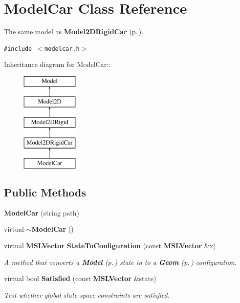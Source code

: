 \section{Model\-Car  Class Reference}
\label{classModelCar}
The same model as {\bf Model2DRigid\-Car} {\rm (p.\,\pageref{classModel2DRigidCar})}. 


{\tt \#include $<$modelcar.h$>$}

Inheritance diagram for Model\-Car::\begin{figure}[H]
\begin{center}
\leavevmode
\includegraphics[height=5cm]{classModelCar}
\end{center}
\end{figure}
\subsection*{Public Methods}
\begin{CompactItemize}
\item 
{\bf Model\-Car} (string path)
\item 
virtual {\bf $\sim$Model\-Car} ()
\item 
virtual {\bf MSLVector} {\bf State\-To\-Configuration} (const {\bf MSLVector} \&x)
\begin{CompactList}\small\item\em A method that converts a {\bf Model} {\rm (p.\,\pageref{classModel})} state in to a {\bf Geom} {\rm (p.\,\pageref{classGeom})} configuration.\item\end{CompactList}\item 
virtual bool {\bf Satisfied} (const {\bf MSLVector} \&state)
\begin{CompactList}\small\item\em Test whether global state-space constraints are satisfied.\item\end{CompactList}\end{CompactItemize}
